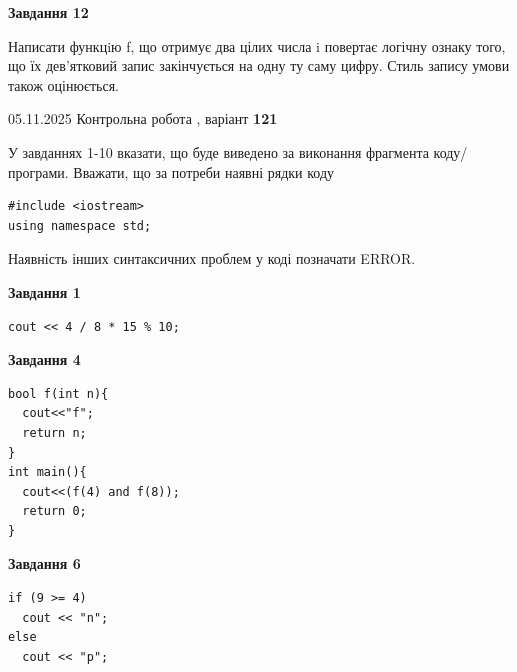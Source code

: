 \documentclass[12pt, ukrainian]{article}
\begin{document}
{\begin {large}
\begin{minipage}[t]{11.0cm}
\begin{center}
\textbf{Завдання 12}
\end{center}

Написати функцiю f, що отримує два цілих числа i повертає логічну ознаку того, що їх дев'ятковий запис закінчується на одну ту саму цифру. Стиль запису умови також оцінюється.\par

\end{minipage}

\end {large}}
\newpage

{\Large{05.11.2025 Контрольна робота , варіант  \No \textbf { 121 }\par}}
{
\begin {large}
У завданнях 1-10 вказати, що буде виведено за виконання фрагмента коду/про\-гра\-ми.
Вважати, що за потреби наявні рядки коду
\begin{verbatim}
#include <iostream>
using namespace std;
\end{verbatim}
Наявність інших синтаксичних проблем у коді позначати ERROR.

\begin{minipage}[t]{7.0cm}

\begin{center}
\textbf{Завдання 1}
\end{center}
\vspace{-8mm}

\begin{verbatim}
cout << 4 / 8 * 15 % 10;
\end{verbatim}



\begin{center}
\textbf{Завдання 4}
\end{center}
\vspace{-8mm}

\begin{verbatim}
bool f(int n){
  cout<<"f";
  return n;
}
int main(){
  cout<<(f(4) and f(8));
  return 0;
}
\end{verbatim}



\begin{center}
\textbf{Завдання 6}
\end{center}
\vspace{-8mm}

\begin{verbatim}
if (9 >= 4)
  cout << "n";
else
  cout << "p";
\end{verbatim}




\end{minipage}
\end{large}}
\end{document}
